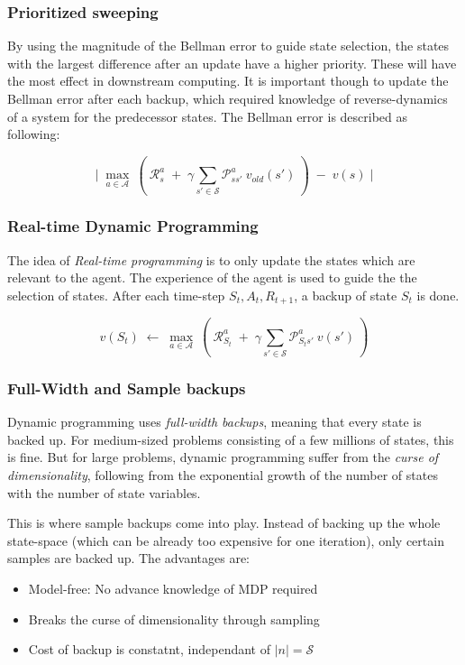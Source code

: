 \documentclass[10pt]{article}
\begin{document}
\subsubsection*{Prioritized sweeping}
By using the magnitude of the Bellman error to guide state selection, the states with the largest difference after an update have a higher priority. These will have the most effect in downstream computing. It is important though to update the Bellman error after each backup, which required knowledge of reverse-dynamics of a system for the predecessor states. The Bellman error is described as following:

\begin{equation}
\Big| \;  \mathop{max}_{a \in \mathcal{A}}\: \left( \: \mathcal{R}_{s}^{a}\;+\;\gamma \sum_{s' \in \mathcal{S}} \mathcal{P}_{ss'}^{a}\:v_{old}(s') \: \right) \; - \; v(s) \; \Big|
\end{equation}

\subsubsection{Real-time Dynamic Programming}
The idea of \textit{Real-time programming} is to only update the states which are relevant to the agent. The experience of the agent is used to guide the the selection of states. After each time-step $S_{t}, A_{t}, R_{t+1}$, a backup of state $S_{t}$ is done.

\begin{equation}
v(S_{t})\; \leftarrow \; \mathop{max}_{a \in \mathcal{A}}\: \left( \: \mathcal{R}_{S_{t}}^{a}\;+\;\gamma \sum_{s' \in \mathcal{S}} \mathcal{P}_{S_{t}s'}^{a}\:v(s') \: \right) 
\end{equation}

\subsubsection{Full-Width and Sample backups}
Dynamic programming uses \textit{full-width backups}, meaning that every state is backed up. For medium-sized problems consisting of a few millions of states, this is fine. But for large problems, dynamic programming suffer from the \textit{curse of dimensionality}, following from the exponential growth of the number of states with the number of state variables. 

This is where sample backups come into play. Instead of backing up the whole state-space (which can be already too expensive for one iteration), only certain samples are backed up. The advantages are:
\begin{itemize}
\item Model-free: No advance knowledge of MDP required
\item Breaks the curse of dimensionality through sampling
\item Cost of backup is constatnt, independant of $|n|=\mathcal{S}$ 
\end{itemize}
\end{document}
